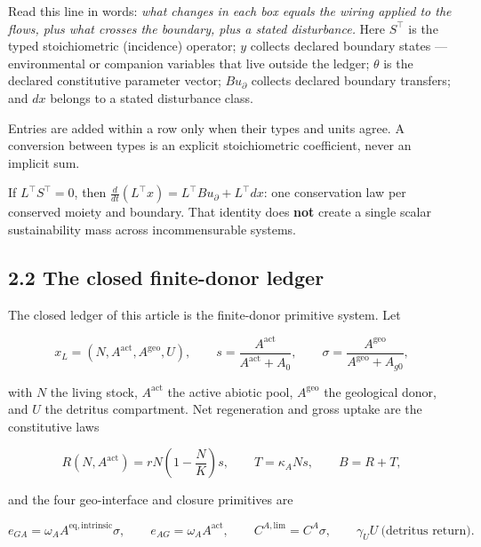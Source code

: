 \documentclass[11pt]{article}
\begin{document}
Read this line in words: \emph{what changes in each box equals the wiring applied to the flows, plus what crosses the boundary, plus a stated disturbance.} Here \(S^{\top}\) is the typed stoichiometric (incidence) operator; \(y\) collects declared boundary states --- environmental or companion variables that live outside the ledger; \(\theta\) is the declared constitutive parameter vector; \(B u_\partial\) collects declared boundary transfers; and \(dx\) belongs to a stated disturbance class.

Entries are added within a row only when their types and units agree. A conversion between types is an explicit stoichiometric coefficient, never an implicit sum.

If \(L^{\top}S^{\top}=0\), then \(\tfrac{d}{dt}(L^{\top}x) =\allowbreak{} L^{\top}B u_\partial +\allowbreak{} L^{\top}dx\): one conservation law per conserved moiety and boundary. That identity does \textbf{not} create a single scalar sustainability mass across incommensurable systems.

\subsection*{2.2 The closed finite-donor ledger}\label{22-the-closed-finite-donor-ledger}

The closed ledger of this article is the finite-donor primitive system. Let 

$$x_L = (N, A^{\mathrm{act}}, A^{\mathrm{geo}}, U), \qquad s = \frac{A^{\mathrm{act}}}{A^{\mathrm{act}} + A_0}, \qquad \sigma = \frac{A^{\mathrm{geo}}}{A^{\mathrm{geo}} + A_{g0}},$$

 with \(N\) the living stock, \(A^{\mathrm{act}}\) the active abiotic pool, \(A^{\mathrm{geo}}\) the geological donor, and \(U\) the detritus compartment. Net regeneration and gross uptake are the constitutive laws 

$$R(N, A^{\mathrm{act}}) = rN\left(1 - \frac{N}{K}\right)s, \qquad T = \kappa_A N s, \qquad B = R + T,$$

 and the four geo-interface and closure primitives are 

$$e_{GA} = \omega_A A^{\mathrm{eq,intrinsic}} \sigma, \qquad e_{AG} = \omega_A A^{\mathrm{act}}, \qquad C^{A,\mathrm{lim}} = C^A \sigma, \qquad \gamma_U U \ \text{(detritus return)}.$$
\end{document}
